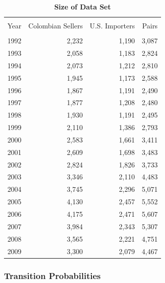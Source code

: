 \documentclass[12pt,titlepage]{article}
\begin{document}
\begin{table}[bph]
    \centering
    \begin{tabular}{lrrr} \hline \hline \\
        Year & Colombian Sellers & U.S. Importers & Pairs \\ \hline \\
        1992 & 2,232             & 1,190          & 3,087  \\
        1993 & 2,058             & 1,183          & 2,824  \\
        1994 & 2,073             & 1,212          & 2,810  \\
        1995 & 1,945             & 1,173          & 2,588  \\
        1996 & 1,867             & 1,191          & 2,490  \\
        1997 & 1,877             & 1,208          & 2,480  \\
        1998 & 1,930             & 1,191          & 2,495  \\
        1999 & 2,110             & 1,386          & 2,793  \\
        2000 & 2,583             & 1,661          & 3,411  \\
        2001 & 2,609             & 1,698          & 3,483  \\
        2002 & 2,824             & 1,826          & 3,733  \\
        2003 & 3,346             & 2,110          & 4,483  \\
        2004 & 3,745             & 2,296          & 5,071  \\
        2005 & 4,130             & 2,457          & 5,552  \\
        2006 & 4,175             & 2,471          & 5,607  \\
        2007 & 3,984             & 2,343          & 5,307  \\
        2008 & 3,565             & 2,221          & 4,751  \\
        2009 & 3,300             & 2,079          & 4,467  \\ \hline
    \end{tabular}
    \caption{\textbf{Size of Data Set}}
    \label{tab:data_size}\centering{\small \ }
\end{table}

\subsubsection{Transition Probabilities}
\end{document}
